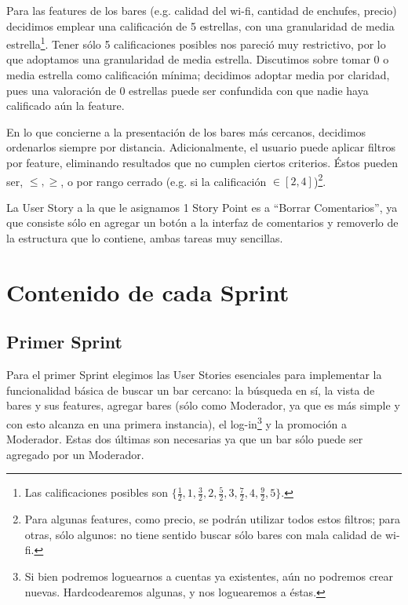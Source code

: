\documentclass[hidelinks,a4paper,11pt, nofootinbib]{article}
\begin{document}
\par Para las features de los bares (e.g. calidad del wi-fi, cantidad de enchufes, precio) decidimos emplear una calificación de 5 estrellas, con una granularidad de media estrella\footnote{Las calificaciones posibles son $\{ \frac{1}{2}, 1, \frac{3}{2}, 2, \frac{5}{2}, 3, \frac{7}{2}, 4, \frac{9}{2}, 5 \}$.}.
Tener sólo 5 calificaciones posibles nos pareció muy restrictivo, por lo que adoptamos una granularidad de media estrella.
Discutimos sobre tomar 0 o media estrella como calificación mínima; decidimos adoptar media por claridad, pues una valoración de 0 estrellas puede ser confundida con que nadie haya calificado aún la feature.

\par En lo que concierne a la presentación de los bares más cercanos, decidimos ordenarlos siempre por distancia.
Adicionalmente, el usuario puede aplicar filtros por feature, eliminando resultados que no cumplen ciertos criterios. 
Éstos pueden ser, $\leqslant, \geqslant$, o por rango cerrado (e.g. si la calificación $\in [2, 4]$)\footnote{Para algunas features, como precio, se podrán utilizar todos estos filtros; para otras, sólo algunos: no tiene sentido buscar sólo bares con mala calidad de wi-fi.}.

\par La User Story a la que le asignamos 1 Story Point es a ``Borrar Comentarios'', ya que consiste sólo en agregar un botón a la interfaz de comentarios y removerlo de la estructura que lo contiene, ambas tareas muy sencillas.

\section{Contenido de cada Sprint}

\subsection{Primer Sprint}

\par Para el primer Sprint elegimos las User Stories esenciales para implementar la funcionalidad básica de buscar un bar cercano: la búsqueda en sí, la vista de bares y sus features, agregar bares (sólo como Moderador, ya que es más simple y con esto alcanza en una primera instancia), el log-in\footnote{Si bien podremos loguearnos a cuentas ya existentes, aún no podremos crear nuevas. Hardcodearemos algunas, y nos loguearemos a éstas.} y la promoción a Moderador.
Estas dos últimas son necesarias ya que un bar sólo puede ser agregado por un Moderador.
\end{document}
